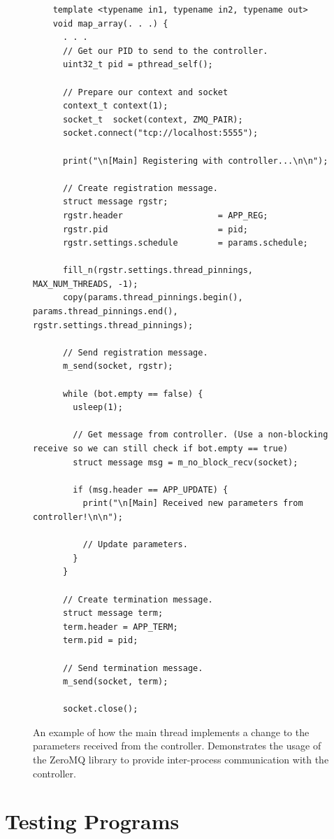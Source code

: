 \begin{figure}
	\begin{lstlisting}
	template <typename in1, typename in2, typename out>
	void map_array(. . .) {
	  . . .
	  // Get our PID to send to the controller.
	  uint32_t pid = pthread_self();

	  // Prepare our context and socket
	  context_t context(1);
	  socket_t  socket(context, ZMQ_PAIR);
	  socket.connect("tcp://localhost:5555");

	  print("\n[Main] Registering with controller...\n\n");
	        
	  // Create registration message.
	  struct message rgstr;
	  rgstr.header                   = APP_REG;
	  rgstr.pid                      = pid;
	  rgstr.settings.schedule        = params.schedule;

	  fill_n(rgstr.settings.thread_pinnings, MAX_NUM_THREADS, -1);
	  copy(params.thread_pinnings.begin(), params.thread_pinnings.end(), rgstr.settings.thread_pinnings);

	  // Send registration message.
	  m_send(socket, rgstr);

	  while (bot.empty == false) {
	    usleep(1);

	    // Get message from controller. (Use a non-blocking receive so we can still check if bot.empty == true)
	    struct message msg = m_no_block_recv(socket);

	    if (msg.header == APP_UPDATE) {
	      print("\n[Main] Received new parameters from controller!\n\n");

	      // Update parameters.
	    }
	  }

	  // Create termination message.
	  struct message term;
	  term.header = APP_TERM;
	  term.pid = pid;

	  // Send termination message.
	  m_send(socket, term);

	  socket.close();
	\end{lstlisting}

	\caption{An example of how the main thread implements a change to the parameters received from the controller. Demonstrates the usage of the ZeroMQ library to provide inter-process communication with the controller.}
	\label{fig:implementation_controller_comms}
\end{figure}



\section{Testing Programs}

